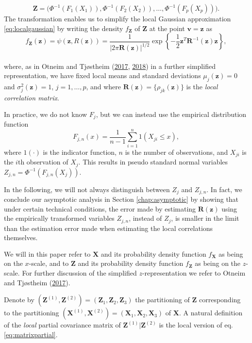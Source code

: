 \documentclass[
  12pt,
  letterpaper]{article}
\newcommand{\X}{\bm{X}}
\newcommand{\Xone}{\bm{X}^{(1)}}
\newcommand{\Xtwo}{\bm{X}^{(2)}}
\newcommand{\Z}{\bm{Z}}
\newcommand{\z}{\bm{z}}
\newcommand{\Zone}{\bm{Z}^{(1)}}
\newcommand{\Ztwo}{\bm{Z}^{(2)}}
\newcommand{\fv}{\bm{v}}
\newcommand{\R}{\bm{R}}
\theoremstyle{definition}
\theoremstyle{definition}
\theoremstyle{definition}
\theoremstyle{remark}
\begin{document}
\begin{equation}
\Z = \Big(\Phi^{-1}\left(F_{1}(X_1)\right), \Phi^{-1}\left(F_{2}(X_2)\right), \ldots, \Phi^{-1}\left(F_{p}(X_p)\right)\Big).
\label{eq:trans}
\end{equation}
The transformation enables us to simplify the local Gaussian approximation \eqref{eq:localgaussian} by writing the density \(f_{\Z}\) of \(\Z\) at the point \(\fv = \z\) as
\begin{equation}
f_{\Z}(\z) = \psi(\z, R(\z)) = \frac{1}{|2\pi\R(\z)|^{1/2}}\exp\left\{-\frac{1}{2}\z^T\R^{-1}(\z)\z\right\},
\label{eq:lgdeapprox}
\end{equation}\\
where, as in Otneim and Tjøstheim (\protect\hyperlink{ref-otneim2017locally}{2017}, \protect\hyperlink{ref-otneim2017conditional}{2018}) in a further simplified representation, we have fixed local means and standard deviations \(\mu_j(\z) = 0\) and \(\sigma_j^2(\z) = 1\), \(j = 1,\ldots,p\), and where \(\R(\z) = \{\rho_{jk}(\z)\}\) is the \emph{local correlation matrix}.

In practice, we do not know \(F_{j}\), but we can instead use the empirical distribution function
\[F_{j,n}(x) = \frac{1}{n-1}\sum_{i=1}^n 1\left(X_{ji} \leq x\right),\]
where \(1(\cdot)\) is the indicator function, \(n\) is the number of observations, and \(X_{ji}\) is the \(i\)th observation of \(X_j\). This results in pseudo standard normal variables \(Z_{j,n} = \Phi^{-1}(F_{j,n}(X_j))\).

In the following, we will not always distinguish between \(Z_j\) and \(Z_{j,n}\). In fact, we conclude our asymptotic analysis in Section \ref{chap:asymptotic} by showing that under certain technical conditions, the error made by estimating \(\R(\z)\) using the empirically transformed variables \(Z_{j,n}\), instead of \(Z_j\), is smaller in the limit than the estimation error made when estimating the local correlations themselves.

We will in this paper refer to \(\X\) and its probability density function \(f_{\X}\) as being on the \(x\)-scale, and to \(\Z\) and its probability density function \(f_{\Z}\) as being on the \(z\)-scale. For further discussion of the simplified \(z\)-representation we refer to Otneim and Tjøstheim (\protect\hyperlink{ref-otneim2017locally}{2017}).

Denote by \((\Zone, \Ztwo) = (\Z_1, \Z_2, \Z_3)\) the partitioning of \(\Z\) corresponding to the partitioning \((\Xone, \Xtwo) = (\X_1, \X_2, \X_3)\) of \(\X\). A natural definition of the \emph{local} partial covariance matrix of \(\Zone|\Ztwo\) is the local version of eq. \eqref{eq:matrixpartial}.
\end{document}
